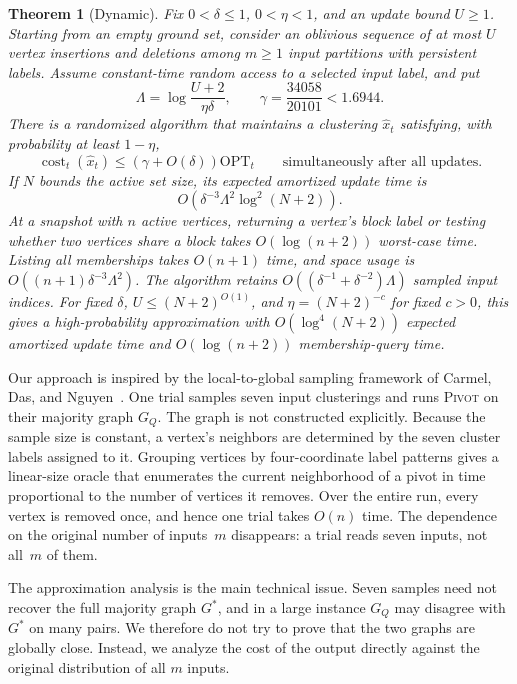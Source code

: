 \documentclass[11pt,letterpaper]{article}
\newtheorem{theorem}{Theorem}[section]
\theoremstyle{definition}
\theoremstyle{remark}
\newcommand{\OPT}{\mathrm{OPT}}
\newcommand{\cost}{\operatorname{cost}}
\newcommand{\1}{\mathbf{1}}
\begin{document}
\begin{theorem}[Dynamic]\label{thm:dynamic-intro}
Fix $0<\delta\le1$, $0<\eta<1$, and an update bound $U\ge1$.  Starting from an empty ground set, consider an oblivious sequence of at most $U$ vertex insertions and deletions among $m\ge1$ input partitions with persistent labels.  Assume constant-time random access to a selected input label, and put
\[
 \Lambda=\log\frac{U+2}{\eta\delta},
 \qquad \gamma=\frac{34058}{20101}<1.6944.
\]
There is a randomized algorithm that maintains a clustering $\widehat x_t$ satisfying, with probability at least $1-\eta$,
\[
 \cost_t(\widehat x_t)\le(\gamma+O(\delta))\OPT_t
 \qquad\text{simultaneously after all updates.}
\]
If $N$ bounds the active set size, its expected amortized update time is
\[
 O\!\left(\delta^{-3}\Lambda^2\log^2(N+2)\right).
\]
At a snapshot with $n$ active vertices, returning a vertex's block label or testing whether two vertices share a block takes $O(\log(n+2))$ worst-case time.  Listing all memberships takes $O(n+1)$ time, and space usage is $O((n+1)\delta^{-3}\Lambda^2)$.  The algorithm retains $O((\delta^{-1}+\delta^{-2})\Lambda)$ sampled input indices.  For fixed $\delta$, $U\le(N+2)^{O(1)}$, and $\eta=(N+2)^{-c}$ for fixed $c>0$, this gives a high-probability approximation with $O(\log^4(N+2))$ expected amortized update time and $O(\log(n+2))$ membership-query time.
\end{theorem}

Our approach is inspired by the local-to-global sampling framework of Carmel, Das, and Nguyen~\cite{carmel-das-nguyen}.  One trial samples seven input clusterings and runs \textsc{Pivot} on their majority graph $G_Q$.  The graph is not constructed explicitly.  Because the sample size is constant, a vertex's neighbors are determined by the seven cluster labels assigned to it.  Grouping vertices by four-coordinate label patterns gives a linear-size oracle that enumerates the current neighborhood of a pivot in time proportional to the number of vertices it removes.  Over the entire run, every vertex is removed once, and hence one trial takes $O(n)$ time.  The dependence on the original number of inputs~$m$ disappears: a trial reads seven inputs, not all~$m$ of them.

The approximation analysis is the main technical issue.  Seven samples need not recover the full majority graph $G^*$, and in a large instance $G_Q$ may disagree with $G^*$ on many pairs.  We therefore do not try to prove that the two graphs are globally close.  Instead, we analyze the cost of the output directly against the original distribution of all $m$ inputs.
\end{document}
